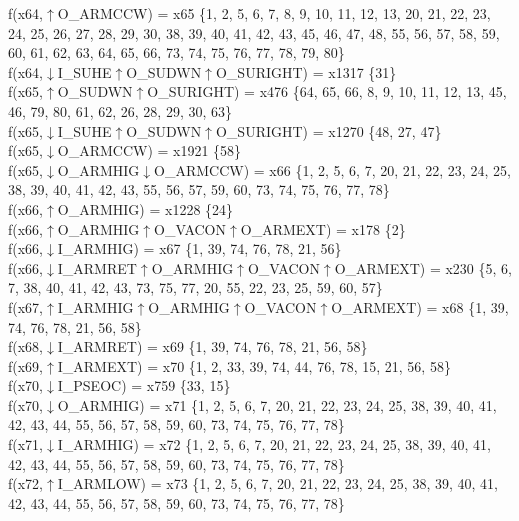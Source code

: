 f(x64,$\uparrow$O\_ARMCCW) = x65 \{1, 2, 5, 6, 7, 8, 9, 10, 11, 12, 13, 20, 21, 22, 23, 24, 25, 26, 27, 28, 29, 30, 38, 39, 40, 41, 42, 43, 45, 46, 47, 48, 55, 56, 57, 58, 59, 60, 61, 62, 63, 64, 65, 66, 73, 74, 75, 76, 77, 78, 79, 80\} \\  
f(x64,$\downarrow$I\_SUHE$\uparrow$O\_SUDWN$\uparrow$O\_SURIGHT) = x1317 \{31\} \\  
f(x65,$\uparrow$O\_SUDWN$\uparrow$O\_SURIGHT) = x476 \{64, 65, 66, 8, 9, 10, 11, 12, 13, 45, 46, 79, 80, 61, 62, 26, 28, 29, 30, 63\} \\  
f(x65,$\downarrow$I\_SUHE$\uparrow$O\_SUDWN$\uparrow$O\_SURIGHT) = x1270 \{48, 27, 47\} \\  
f(x65,$\downarrow$O\_ARMCCW) = x1921 \{58\} \\  
f(x65,$\downarrow$O\_ARMHIG$\downarrow$O\_ARMCCW) = x66 \{1, 2, 5, 6, 7, 20, 21, 22, 23, 24, 25, 38, 39, 40, 41, 42, 43, 55, 56, 57, 59, 60, 73, 74, 75, 76, 77, 78\} \\  
f(x66,$\uparrow$O\_ARMHIG) = x1228 \{24\} \\  
f(x66,$\uparrow$O\_ARMHIG$\uparrow$O\_VACON$\uparrow$O\_ARMEXT) = x178 \{2\} \\  
f(x66,$\downarrow$I\_ARMHIG) = x67 \{1, 39, 74, 76, 78, 21, 56\} \\  
f(x66,$\downarrow$I\_ARMRET$\uparrow$O\_ARMHIG$\uparrow$O\_VACON$\uparrow$O\_ARMEXT) = x230 \{5, 6, 7, 38, 40, 41, 42, 43, 73, 75, 77, 20, 55, 22, 23, 25, 59, 60, 57\} \\  
f(x67,$\uparrow$I\_ARMHIG$\uparrow$O\_ARMHIG$\uparrow$O\_VACON$\uparrow$O\_ARMEXT) = x68 \{1, 39, 74, 76, 78, 21, 56, 58\} \\  
f(x68,$\downarrow$I\_ARMRET) = x69 \{1, 39, 74, 76, 78, 21, 56, 58\} \\  
f(x69,$\uparrow$I\_ARMEXT) = x70 \{1, 2, 33, 39, 74, 44, 76, 78, 15, 21, 56, 58\} \\  
f(x70,$\downarrow$I\_PSEOC) = x759 \{33, 15\} \\  
f(x70,$\downarrow$O\_ARMHIG) = x71 \{1, 2, 5, 6, 7, 20, 21, 22, 23, 24, 25, 38, 39, 40, 41, 42, 43, 44, 55, 56, 57, 58, 59, 60, 73, 74, 75, 76, 77, 78\} \\  
f(x71,$\downarrow$I\_ARMHIG) = x72 \{1, 2, 5, 6, 7, 20, 21, 22, 23, 24, 25, 38, 39, 40, 41, 42, 43, 44, 55, 56, 57, 58, 59, 60, 73, 74, 75, 76, 77, 78\} \\  
f(x72,$\uparrow$I\_ARMLOW) = x73 \{1, 2, 5, 6, 7, 20, 21, 22, 23, 24, 25, 38, 39, 40, 41, 42, 43, 44, 55, 56, 57, 58, 59, 60, 73, 74, 75, 76, 77, 78\} \\  
